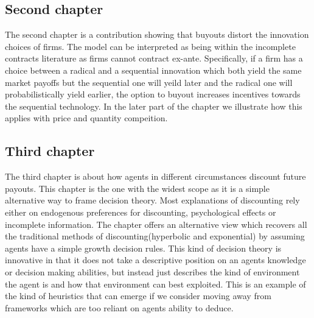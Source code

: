 \documentclass[12pt]{article}
\numberwithin{equation}{section}
\begin{document}
\subsection{Second chapter}

The second chapter is a contribution showing that buyouts distort the innovation choices of firms. The model can be interpreted as being within the incomplete contracts literature as firms cannot contract ex-ante. Specifically, if a firm has a choice between a radical and a sequential innovation which both yield the same market payoffs but the sequential one will yeild later and the radical one will probabilistically yield earlier, the option to buyout increases incentives towards the sequential technology. In the later part of the chapter we illustrate how this applies with price and quantity compeition. 

 \subsection{Third chapter}

The third chapter is about how agents in different circumstances discount future payouts. This chapter is the one with the widest scope as it is a simple alternative way to frame decision theory. Most explanations of discounting rely either on endogenous preferences for discounting, psychological effects or incomplete information. The chapter offers an alternative view which recovers all the traditional methods of discounting(hyperbolic and exponential) by assuming agents have a simple growth decision rules. This kind of decision theory is innovative in that it does not take a descriptive position on an agents knowledge or decision making abilities, but instead just describes the kind of environment the agent is and how that environment can best exploited. This is an example of the kind of heuristics that can emerge if we consider moving away from frameworks which are too reliant on agents ability to deduce. 



\end{document}
